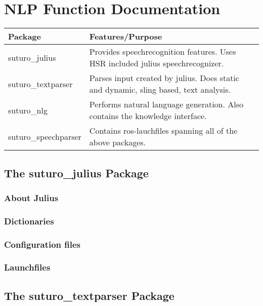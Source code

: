 \documentclass[main.tex]{subfiles}
\begin{document}
	\begingroup

	\renewcommand{\cleardoublepage}{}

	\renewcommand{\clearpage}{}
	
	\newpage

	\chapter{NLP Function Documentation}
		
		
	\begin{tabular}{|l|p{9cm}|}
		\hline
		\textbf{Package} & \textbf{Features/Purpose} \\
		\hline
		suturo\_julius & Provides speechrecognition features. Uses HSR included julius speechrecognizer. \\
		\hline 
		suturo\_textparser & Parses input created by julius. Does static and dynamic, sling based, text analysis. \\
		\hline
		suturo\_nlg & Performs natural language generation. Also contains the knowledge interface. \\
		\hline 
		suturo\_speechparser & Contains ros-lauchfiles spanning all of the above packages.\\
		\hline
	\end{tabular}
	
	\section{The suturo\_julius Package}
		\subsection{About Julius}	
		\subsection{Dictionaries}
		\subsection{Configuration files}
		\subsection{Launchfiles}
	
	\section{The suturo\_textparser Package}
\end{document}
